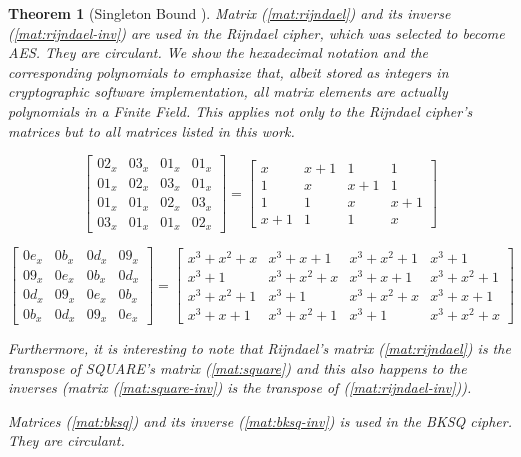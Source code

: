 \documentclass{report}
\newtheorem{theorem}{Theorem}{\bfseries}{\itshape}
\begin{document}
\begin{theorem}[Singleton Bound \cite{SloaneBook}]
Matrix (\ref{mat:rijndael}) and its inverse (\ref{mat:rijndael-inv}) are used in the Rijndael \cite{DesignOfRijndael2002} cipher, which was selected to become AES. They are circulant. We show the hexadecimal notation and the corresponding polynomials to emphasize that, albeit stored as integers in cryptographic software implementation, all matrix elements are actually polynomials in a Finite Field. This applies not only to the Rijndael cipher's matrices but to all matrices listed in this work.

\begin{equation}\label{mat:rijndael}
\begin{bmatrix}
02_x & 03_x & 01_x & 01_x\\
01_x & 02_x & 03_x & 01_x\\
01_x & 01_x & 02_x & 03_x\\
03_x & 01_x & 01_x & 02_x
\end{bmatrix}
=
\begin{bmatrix}
x & x+1 & 1 & 1\\
1 & x & x+1 & 1\\
1 & 1 & x & x+1\\
x+1 & 1 & 1 & x
\end{bmatrix}
\end{equation}

\begin{equation}\label{mat:rijndael-inv}
\begin{bmatrix}
0e_x & 0b_x & 0d_x & 09_x\\
09_x & 0e_x & 0b_x & 0d_x\\
0d_x & 09_x & 0e_x & 0b_x\\
0b_x & 0d_x & 09_x & 0e_x
\end{bmatrix}
=
\begin{bmatrix}
x^3+x^2+x & x^3+x+1 & x^3+x^2+1 & x^3+1\\
x^3+1 & x^3+x^2+x & x^3+x+1 & x^3+x^2+1\\
x^3+x^2+1 & x^3+1 & x^3+x^2+x & x^3+x+1\\
x^3+x+1 & x^3+x^2+1 & x^3+1 & x^3+x^2+x
\end{bmatrix}
\end{equation}

Furthermore, it is interesting to note that Rijndael's matrix (\ref{mat:rijndael}) is the transpose of SQUARE's matrix (\ref{mat:square}) and this also happens to the inverses (matrix (\ref{mat:square-inv}) is the transpose of (\ref{mat:rijndael-inv})).

Matrices (\ref{mat:bksq}) and its inverse (\ref{mat:bksq-inv}) is used in the BKSQ \cite{BKSQ1998} cipher. They are circulant.


\end{theorem}
\end{document}
